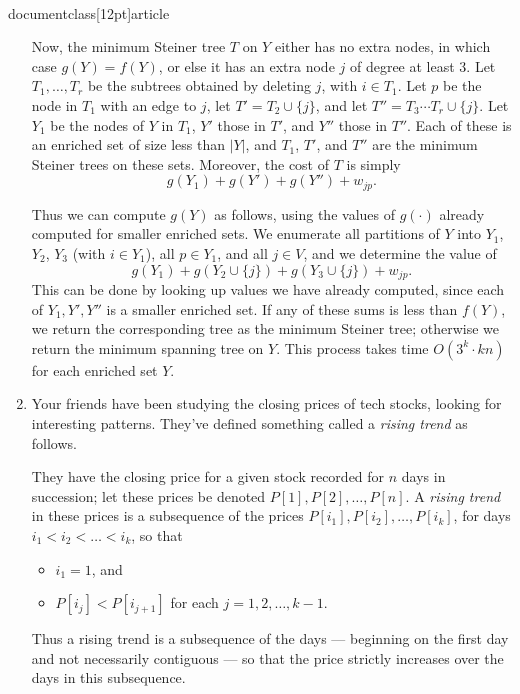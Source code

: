 \\documentclass[12pt]{article}
\begin{document}
\begin{enumerate}
{Now, the minimum Steiner tree $T$ on $Y$ either has no extra nodes,
in which case $g(Y) = f(Y)$, or else it has an
extra node $j$ of degree at least $3$.
Let $T_1, \ldots, T_r$ be the subtrees obtained by
deleting $j$, with $i \in T_1$.
Let $p$ be the node in $T_1$ with an edge to $j$,
let $T' = T_2 \cup \{j\}$, and let 
$T'' = T_3 \cdots T_r \cup \{j\}$.
Let $Y_1$ be the nodes of $Y$ in $T_1$,
$Y'$ those in $T'$, and $Y''$ those in $T''$.
Each of these is an enriched set of size less than $|Y|$,
and $T_1$, $T'$, and $T''$ are the minimum Steiner trees on these sets.
Moreover, the cost of $T$ is simply
$$g(Y_1) + g(Y') + g(Y'') + w_{jp}.$$

Thus we can compute $g(Y)$ as follows, using
the values of $g(\cdot)$ already computed for smaller enriched sets.
We enumerate
all partitions of $Y$ into $Y_1$, $Y_2$, $Y_3$
(with $i \in Y_1$),
all $p \in Y_1$, and all $j \in V$, and we determine the value of 
$$g(Y_1) + g(Y_2 \cup \{j\}) + g(Y_3 \cup \{j\}) + w_{jp}.$$
This can be done by looking up values we have already
computed, since each of $Y_1, Y', Y''$ is a smaller enriched set.
If any of these sums is less than $f(Y)$, we return 
the corresponding tree as the minimum Steiner tree;
otherwise we return the minimum spanning tree on $Y$.
This process takes time $O(3^k \cdot kn)$ for each enriched set $Y$.

}




\item

Your friends have been studying the closing prices of tech stocks,
looking for interesting patterns.
They've defined something called a {\em rising trend} as follows.

They have the closing price for a given stock recorded for
$n$ days in succession;
let these prices be denoted $P[1], P[2], \ldots, P[n]$.
A {\em rising trend} in these prices is a subsequence
of the prices $P[i_1], P[i_2], \ldots, P[i_k]$,
for days $i_1 < i_2 < \ldots < i_k$, so that
\begin{itemize}
\item $i_1 = 1$, and
\item $P[i_j] < P[i_{j+1}]$ for each $j = 1, 2, \ldots, k-1$.
\end{itemize}
Thus a rising trend is a subsequence of the days
--- beginning on the first day and not necessarily contiguous ---
so that the price strictly increases over the days
in this subsequence.


\end{enumerate}
\end{document}
